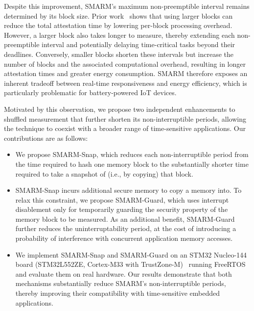 \documentclass[conference]{IEEEtran}
\newcommand{\smarmcopy}{SMARM-Snap\xspace}
\newcommand{\smarmlock}{SMARM-Guard\xspace}
\begin{document}
Despite this improvement, SMARM's maximum non-preemptible interval remains determined by its block size. Prior work~\cite{smarmplus2026,carpent2018smarm} shows that using larger blocks can reduce the total attestation time by lowering per-block processing overhead. However, a larger block also takes longer to measure, thereby extending each non-preemptible interval and potentially delaying time-critical tasks beyond their deadlines. Conversely, smaller blocks shorten these intervals but increase the number of blocks and the associated computational overhead, resulting in longer attestation times and greater energy consumption. SMARM therefore exposes an inherent tradeoff between real-time responsiveness and energy efficiency, which is particularly problematic for battery-powered IoT devices.


Motivated by this observation, we propose two independent enhancements to shuffled measurement that further shorten its non-interruptible periods, allowing the technique to coexist with a broader range of time-sensitive applications. 
Our contributions are as follows:

\begin{itemize}
\item We propose \smarmcopy, which reduces each non-interruptible period from the time required to hash one memory block to the substantially shorter time required to take a snapshot of (i.e., by copying) that block.


\item \smarmcopy incurs additional secure memory to copy a memory into. To relax this constraint, we propose \smarmlock, which uses interrupt disablement only for temporarily guarding the security property of the memory block to be measured. 
As an additional benefit, \smarmlock further reduces the uninterruptability period, at the cost of introducing a probability of interference with concurrent application memory accesses.

\item We implement \smarmcopy and \smarmlock on an STM32 Nucleo-144 board (STM32L552ZE, Cortex-M33 with TrustZone-M)~\cite{stm32nucleo144,stm32l552} running FreeRTOS and evaluate them on real hardware. Our results demonstrate that both mechanisms substantially reduce SMARM's non-interruptible periods, thereby improving their compatibility with time-sensitive embedded applications.


\end{itemize}
\end{document}
